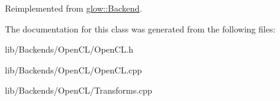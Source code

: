 Reimplemented from \hyperlink{classglow_1_1_backend_a19b5580a7274a1457bcdf3fc05f98cbd}{glow\+::\+Backend}.



The documentation for this class was generated from the following files\+:\begin{DoxyCompactItemize}
\item 
lib/\+Backends/\+Open\+C\+L/Open\+C\+L.\+h\item 
lib/\+Backends/\+Open\+C\+L/Open\+C\+L.\+cpp\item 
lib/\+Backends/\+Open\+C\+L/Transforms.\+cpp\end{DoxyCompactItemize}
